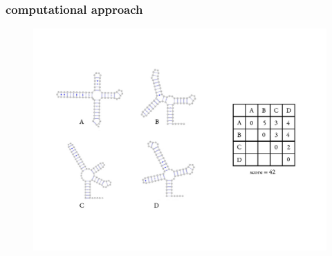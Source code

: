 \documentclass{beamer}
\begin{document}
\begin{frame}
	\frametitle{computational approach}

	\begin{figure}
		\centering
		\includegraphics[scale=1.2]{figs/consensus}
	\end{figure}
	

\end{frame}
\end{document}
